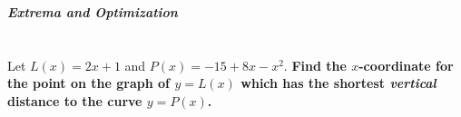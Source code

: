 \documentclass[english]{article}
\DeclarePairedDelimiter\abs{\lvert}{\rvert}%
\newcommand{\prob}[1]{\setcounter{section}{#1-1}\section{}}
\newcommand{\prt}[1]{\setcounter{subsection}{#1-1}\subsection{}}
\theoremstyle{remark}
\theoremstyle{definition}
\begin{document}
		
	\begin{center}{\Large\textbf{\emph{Extrema and Optimization}}}\end{center}
	\prob{10} Let $L(x)=2x+1$ and $P(x)=-15+8x-x^2$.
\textbf{ Find the $x$-coordinate for the point on the graph of $y=L(x)$ which has the shortest \emph{vertical} distance to the curve $y=P(x)$. }\vspace{3.75in}
%	
%		
%		
	
\end{document}
